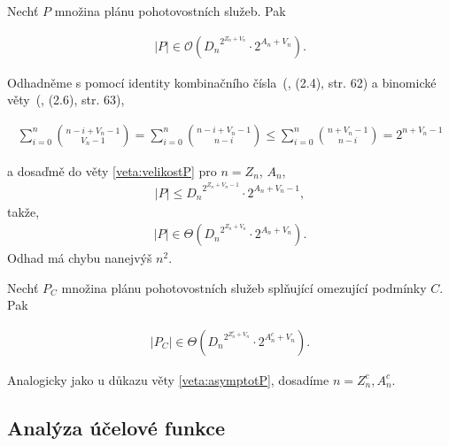\begin{veta}\label{veta:asymptotP}
  Nechť $P$ množina plánu pohotovostních služeb. Pak 

  \begin{align*}
    |P| \in \mathcal{O} \left ({D_n}^{2^{Z_n + V_n}} \cdot 2^{A_n + V_n} \right ).
  \end{align*}
\end{veta}

\begin{dukaz}
  Odhadněme s pomocí identity kombinačního čísla~(\citet{Diskretka}, (2.4), str. 62) a binomické věty~(\citet{Diskretka}, (2.6), str. 63),

  \begin{align*}
    \sum_{i=0}^{n} \binom{n - i + V_n - 1}{V_n - 1} =
    \sum_{i=0}^{n} \binom{n - i + V_n - 1}{n - i} \leq
    \sum_{i=0}^{n} \binom{n + V_n - 1}{n - i} =
    2^{n + V_n - 1}
  \end{align*}

  a dosaďmě do věty \ref{veta:velikostP} pro $n = Z_n$, $A_n$,
  \begin{align*}
    |P| \leq {D_n}^{2^{Z_n + V_n - 1}} \cdot 2^{A_n + V_n - 1},
  \end{align*}
  takže,
  \begin{align*}
    |P| \in \Theta({D_n}^{2^{Z_n + V_n}} \cdot 2^{A_n + V_n}).
  \end{align*}
  Odhad má chybu nanejvýš $n^2$.
\end{dukaz}

\begin{veta}\label{veta:PCvelikost}
  Nechť $P_C$ množina plánu pohotovostních služeb splňující omezující podmínky $C$. Pak 

  \begin{align*}
    |P_C| \in \Theta({D_n}^{2^{Z^c_n + V_n}} \cdot 2^{A^c_n + V_n}).
  \end{align*}
\end{veta}

\begin{dukaz}
  Analogicky jako u důkazu věty \ref{veta:asymptotP}, dosadíme $n = Z^c_n, A^c_n$.
\end{dukaz}

\subsection{Analýza účelové funkce}\label{kap:analVicF}

